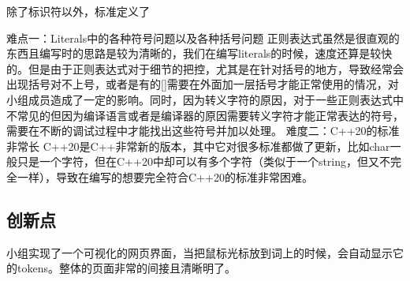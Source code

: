除了标识符以外，标准定义了


难点一：Literals中的各种符号问题以及各种括号问题
正则表达式虽然是很直观的东西且编写时的思路是较为清晰的，我们在编写literals的时候，速度还算是较快的。但是由于正则表达式对于细节的把控，尤其是在针对括号的地方，导致经常会出现括号对不上号，或者是有的[]需要在外面加一层括号才能正常使用的情况，对小组成员造成了一定的影响。同时，因为转义字符的原因，对于一些正则表达式中不常见的但因为编译语言或者是编译器的原因需要转义字符才能正常表达的符号，需要在不断的调试过程中才能找出这些符号并加以处理。
	难度二：C++20的标准非常长
C++20是C++非常新的版本，其中它对很多标准都做了更新，比如char一般只是一个字符，但在C++20中却可以有多个字符（类似于一个string，但又不完全一样），导致在编写的想要完全符合C++20的标准非常困难。

\subsection{创新点}

小组实现了一个可视化的网页界面，当把鼠标光标放到词上的时候，会自动显示它的tokens。整体的页面非常的间接且清晰明了。